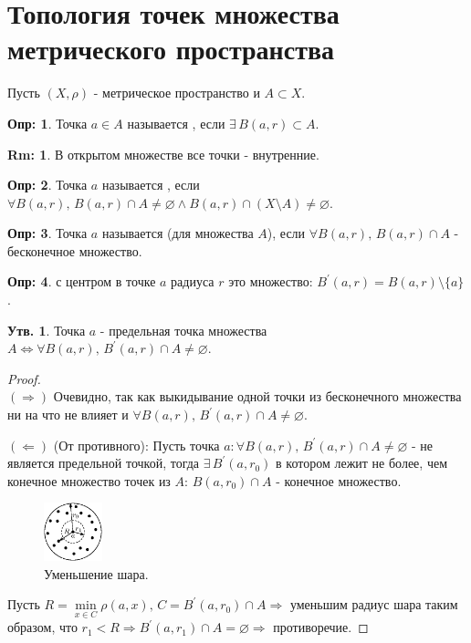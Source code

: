 \documentclass[12pt]{article}
\newcommand{\VN}{\varnothing}
\theoremstyle{definition}
\newtheorem{defn}{Опр:}
\newtheorem{rem}{Rm:}
\newtheorem{prop}{Утв.}
\begin{document}
\section*{Топология точек множества метрического пространства}
Пусть $(X, \rho)$ - метрическое пространство и $A \subset X$.
\begin{defn}
	Точка $a \in A$ называется , если $\exists \, B(a,r)\subset A$.
\end{defn}
\begin{rem}
	В открытом множестве все точки - внутренние.
\end{rem}
\begin{defn}
	Точка $a$ называется , если $\forall B(a,r),\, B(a,r) \cap A \neq \VN \wedge B(a,r) \cap (X \setminus A) \neq \VN$.
\end{defn}
\begin{defn}
	Точка $a$ называется  (для множества $A$), если $\forall B(a,r),\, B(a,r) \cap A$ - бесконечное множество.
\end{defn}
\begin{defn}
	 с центром в точке $a$ радиуса $r$ это множество: $B^\prime(a,r) = B(a,r) \setminus \{a\}$.
\end{defn}

\begin{prop}
	Точка $a$ - предельная точка множества $A \Leftrightarrow \forall B(a,r),\, B^\prime(a,r) \cap A \neq \VN$.
\end{prop}
\begin{proof}\hfill\\
	$(\Rightarrow)$ Очевидно, так как выкидывание одной точки из бесконечного множества ни на что не влияет и $\forall B(a,r),\, B^\prime(a,r) \cap A \neq \VN$.
	
	$(\Leftarrow)$ (От противного): Пусть точка $a \colon \forall B(a,r),\, B^\prime(a,r) \cap A \neq \VN$ - не является предельной точкой, тогда $\exists \, B^\prime(a,r_0)$ в котором лежит не более, чем конечное множество точек из $A$: $B(a,r_0) \cap A$ - конечное множество. 
	\begin{figure}[H]
		\centering
		\includegraphics[width=0.15\textwidth]{7_3.eps}
		\caption{Уменьшение шара.}
		\label{7_3}
	\end{figure}
	Пусть $R = \min\limits_{x \in C}{\rho(a,x)}, \, C = B^\prime(a,r_0)\cap A \Rightarrow$ уменьшим радиус шара таким образом, что $r_1 < R \Rightarrow B^\prime(a,r_1) \cap A = \VN \Rightarrow$ противоречие.
\end{proof}
\end{document}
